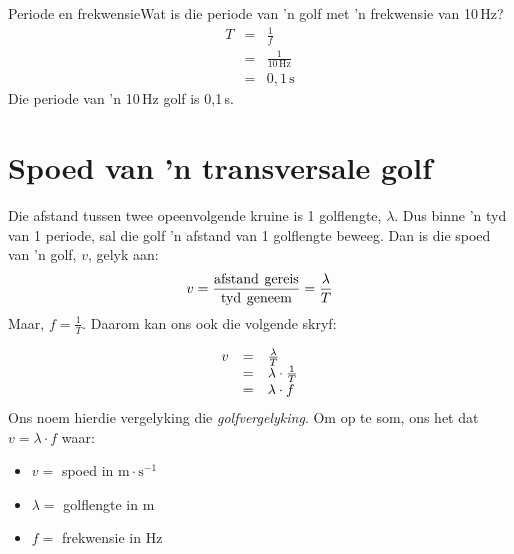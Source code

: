 \begin{definition}
\begin{wex}{Periode en frekwensie}{Wat is die periode van  'n golf met   'n frekwensie van 10\,Hz?}
{\begin{eqnarray*}
T&=&\frac{1}{f}\\
&=&\frac{1}{10\,\text{Hz}}\\
&=&0,1\,\text{s}
\end{eqnarray*}
Die periode van  'n 10\,Hz golf is 0,1\,s.}
\end{wex}

    \noindent
      \label{m38806*uid21}
            \section{Spoed van  'n transversale golf}
            \nopagebreak
   
        \label{m38806*id319706}Die afstand tussen twee opeenvolgende kruine is 1 golflengte, $\lambda $. Dus binne  'n tyd van 1
    periode, sal die golf   'n afstand van 1 golflengte beweeg. Dan is die spoed van   'n golf, $v$, gelyk aan:
        \label{m38806*id319732}\nopagebreak\noindent{}
    \begin{equation}\nonumber
    v=\frac{\text{afstand}\phantom{\rule{4.pt}{0ex}}\text{gereis}}{\text{tyd}\phantom{\rule{4.pt}{0ex}}\text{geneem}}=\frac{\lambda }{T}
      \end{equation}
        \label{m38806*id319776}Maar, $f=\frac{1}{T}$. Daarom kan ons ook die volgende skryf: 
        \label{m38806*id319802}\nopagebreak\noindent{}
          
    \begin{equation}\nonumber
    \begin{array}{ccc}\hfill v& =& \frac{\lambda }{T}\hfill \\ & =& \lambda \ensuremath{\cdot}\frac{1}{T}\hfill \\ & =& \lambda \ensuremath{\cdot}f\hfill \end{array}
      \end{equation}
        \label{m38806*id319870}Ons noem hierdie vergelyking die \textsl{golfvergelyking}. Om op te som, ons het dat $v=\lambda \ensuremath{\cdot}f$ waar: 
        \label{m38806*id319901}\begin{itemize}[noitemsep]
            \label{m38806*uid22}\item $v=$ spoed in $\text{m}\ensuremath{\cdot}\text{s}{}^{-1}$\label{m38806*uid23}\item $\lambda =$ golflengte in $\text{m}$
\label{m38806*uid24}\item $f=$ frekwensie in $\text{Hz}$
\end{itemize}


\end{definition}
